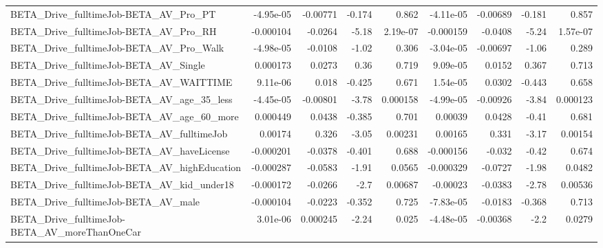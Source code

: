 \begin{tabular}{lrrrrrrrr}
BETA\_Drive\_fulltimeJob-BETA\_AV\_Pro\_PT              &   -4.95e-05 &     -0.00771 &    -0.174 &    0.862 &  -4.11e-05 &    -0.00689 &       -0.181 &         0.857 \\
BETA\_Drive\_fulltimeJob-BETA\_AV\_Pro\_RH              &   -0.000104 &      -0.0264 &     -5.18 & 2.19e-07 &  -0.000159 &     -0.0408 &        -5.24 &      1.57e-07 \\
BETA\_Drive\_fulltimeJob-BETA\_AV\_Pro\_Walk            &   -4.98e-05 &      -0.0108 &     -1.02 &    0.306 &  -3.04e-05 &    -0.00697 &        -1.06 &         0.289 \\
BETA\_Drive\_fulltimeJob-BETA\_AV\_Single              &    0.000173 &       0.0273 &      0.36 &    0.719 &   9.09e-05 &      0.0152 &        0.367 &         0.713 \\
BETA\_Drive\_fulltimeJob-BETA\_AV\_WAITTIME            &    9.11e-06 &        0.018 &    -0.425 &    0.671 &   1.54e-05 &      0.0302 &       -0.443 &         0.658 \\
BETA\_Drive\_fulltimeJob-BETA\_AV\_age\_35\_less         &   -4.45e-05 &     -0.00801 &     -3.78 & 0.000158 &  -4.99e-05 &    -0.00926 &        -3.84 &      0.000123 \\
BETA\_Drive\_fulltimeJob-BETA\_AV\_age\_60\_more         &    0.000449 &       0.0438 &    -0.385 &    0.701 &    0.00039 &      0.0428 &        -0.41 &         0.681 \\
BETA\_Drive\_fulltimeJob-BETA\_AV\_fulltimeJob         &     0.00174 &        0.326 &     -3.05 &  0.00231 &    0.00165 &       0.331 &        -3.17 &       0.00154 \\
BETA\_Drive\_fulltimeJob-BETA\_AV\_haveLicense         &   -0.000201 &      -0.0378 &    -0.401 &    0.688 &  -0.000156 &      -0.032 &        -0.42 &         0.674 \\
BETA\_Drive\_fulltimeJob-BETA\_AV\_highEducation       &   -0.000287 &      -0.0583 &     -1.91 &   0.0565 &  -0.000329 &     -0.0727 &        -1.98 &        0.0482 \\
BETA\_Drive\_fulltimeJob-BETA\_AV\_kid\_under18         &   -0.000172 &      -0.0266 &      -2.7 &  0.00687 &   -0.00023 &     -0.0383 &        -2.78 &       0.00536 \\
BETA\_Drive\_fulltimeJob-BETA\_AV\_male                &   -0.000104 &      -0.0223 &    -0.352 &    0.725 &  -7.83e-05 &     -0.0183 &       -0.368 &         0.713 \\
BETA\_Drive\_fulltimeJob-BETA\_AV\_moreThanOneCar      &    3.01e-06 &     0.000245 &     -2.24 &    0.025 &  -4.48e-05 &    -0.00368 &         -2.2 &        0.0279 \\

\end{tabular}
